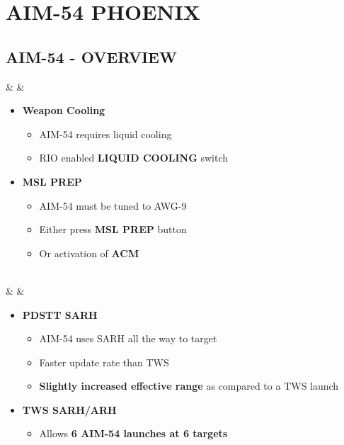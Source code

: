 \documentclass[fontInter]{TechCheck}
\begin{document}
	\clearpage

	\section{AIM-54 PHOENIX}
	\subsection{AIM-54 - OVERVIEW}
	\begin{listlongtable}
		\textbf{\textbullet} &  \hfill \null {} \thumbnar &
		\begin{minipage}[t]{\linewidth}
			\vspace{-7pt}
			\begin{itemize}
				\item \textbf{Weapon Cooling}
				\begin{itemize}
					\item AIM-54 requires liquid cooling
					\item RIO enabled \textbf{LIQUID COOLING} switch
				\end{itemize}
				\item \textbf{MSL PREP}
				\begin{itemize}
					\item AIM-54 must be tuned to AWG-9
					\item Either press \textbf{MSL PREP} button
					\item Or activation of \textbf{ACM}
				\end{itemize}
			\end{itemize}
		\end{minipage} \\
		\midrule
		\textbf{\textbullet} &  &
		\begin{minipage}[t]{\linewidth}
			\vspace{-7pt}
			\begin{itemize}
				\item \textbf{PDSTT SARH}
				\begin{itemize}
					\item AIM-54 uses SARH all the way to target
					\item Faster update rate than TWS
					\item \textbf{Slightly increased effective range} as compared to a TWS launch
				\end{itemize}
				\item \textbf{TWS SARH/ARH}
				\begin{itemize}
					\item Allows \textbf{6 AIM-54 launches at 6 targets}

\end{itemize}
\end{itemize}
\end{minipage}
\end{listlongtable}
\end{document}

